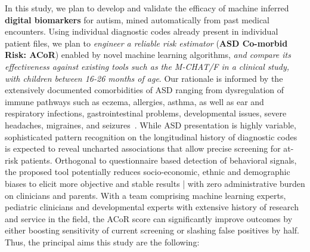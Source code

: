 \documentclass[onecolumn, compsoc,11pt]{IEEEtran}
\def\ZERO{ACoR\xspace}
\begin{document}
In this study, we plan to develop and validate the efficacy of machine inferred \textbf{digital biomarkers} for autism, mined automatically from past medical encounters. Using individual diagnostic codes already present in individual patient files, we plan to \emph{engineer a reliable risk estimator} ({\bf ASD Co-morbid Risk: \ZERO}) enabled by novel  machine learning algorithms, \emph{and compare its effectiveness against existing  tools such as the M-CHAT/F in a clinical study, with children between 16-26 months of age}. Our rationale is informed by the extensively documented comorbidities of ASD ranging from dysregulation of immune pathways such as eczema, allergies, asthma, as well as ear and respiratory infections, gastrointestinal problems, developmental issues, severe headaches, migraines, and seizures~\cite{pmid30733689,pmid22511918}. While ASD presentation is highly variable, sophisticated pattern recognition on the longitudinal history of  diagnostic codes is expected to reveal uncharted associations that allow precise screening for at-risk patients.
Orthogonal to  questionnaire based  detection of behavioral signals, the proposed tool potentially reduces socio-economic, ethnic and demographic biases to elicit more  objective and stable results |  with zero  administrative burden on clinicians and parents. With a team comprising machine learning experts, pediatric clinicians and developmental experts with extensive history of research and service in the field,
the \ZERO score can significantly improve outcomes by either boosting sensitivity of current screening or slashing false positives by half.
%
Thus, the principal aims  this study are the following:
     
\end{document}

